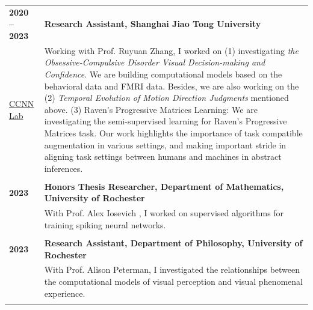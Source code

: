 \documentclass[10pt,letterpaper]{article}
\begin{document}
\begin{xltabular}{\textwidth}{@{}l X@{}}
\textbf{2020 -- 2023} & \textbf{Research Assistant, Shanghai Jiao Tong University} \\
 \href{https://ruyuanzhang.github.io/}{CCNN Lab} & Working with Prof. Ruyuan Zhang, I worked on (1) investigating  \textit{the} \textit{Obsessive-Compulsive Disorder Visual Decision-making and Confidence}. We are  building computational models based on the behavioral data and FMRI data. Besides,   we are also working on the (2) \textit{Temporal Evolution of Motion Direction Judgments}   mentioned above. (3) Raven's Progressive Matrices Learning: We are investigating   the semi-supervised learning for Raven's Progressive Matrices task. Our work highlights   the
importance of task compatible augmentation in various settings, and making important   stride in aligning task settings between humans and machines in abstract inferences.
 \\
\\
\textbf{2023 } & \textbf{Honors Thesis Researcher, Department of Mathematics, University of Rochester} \\

 & With Prof. Alex Iosevich , I worked on supervised algorithms for training   spiking neural networks.
\\
\\
\textbf{2023} & \textbf{Research Assistant, Department of Philosophy, University of Rochester} \\

 & With Prof. Alison Peterman, I investigated the relationships between the   computational models of visual perception and visual phenomenal experience.
 \\
 \\
\hline

\end{xltabular}
\end{document}
